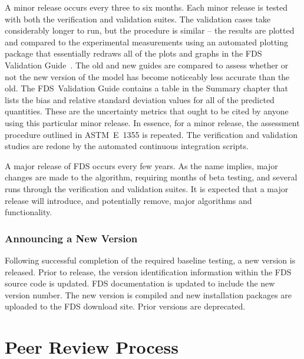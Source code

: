 \documentclass[11pt]{book}
\begin{document}
A minor release occurs every three to six months. Each minor release is tested with both the verification and validation suites. The validation cases take considerably longer to run, but the procedure is similar -- the results are plotted and compared to the experimental measurements using an automated plotting package that essentially redraws all of the plots and graphs in the FDS Validation Guide~\cite{FDS_Validation_Guide}. The old and new guides are compared to assess whether or not the new version of the model has become noticeably less accurate than the old. The FDS~Validation Guide contains a table in the Summary chapter that lists the bias and relative standard deviation values for all of the predicted quantities. These are the uncertainty metrics that ought to be cited by anyone using this particular minor release. In essence, for a minor release, the assessment procedure outlined in ASTM~E~1355 is repeated. The verification and validation studies are redone by the automated continuous integration scripts.

A major release of FDS occurs every few years. As the name implies, major changes are made to the algorithm, requiring months of beta testing, and several runs through the verification and validation suites. It is expected that a major release will introduce, and potentially remove, major algorithms and functionality.


\subsection{Announcing a New Version}

Following successful completion of the required baseline testing, a new version is released.  Prior to release, the version identification information within the FDS source code is updated.  FDS documentation is updated to include the new version number.  The new version is compiled and new installation packages are uploaded to the FDS download site.  Prior versions are deprecated.




\chapter{Peer Review Process}
\end{document}
